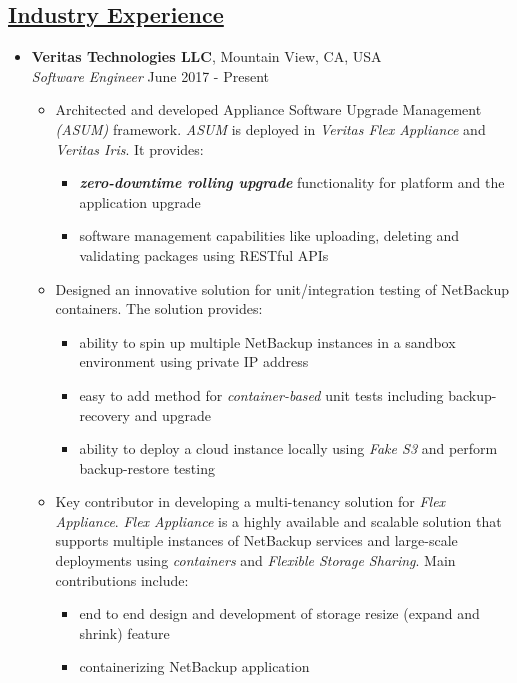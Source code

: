 \documentclass[10pt]{article}
\begin{document}
\subsection*{\underline{Industry Experience}}
\vspace{-0.1cm}
\begin{itemize}[leftmargin=0.15in]
\item {\bfseries Veritas Technologies LLC}, Mountain View, CA, USA \\
{\sl Software Engineer}  \hfill June 2017 - Present
\vspace{-0.15cm}
\begin{itemize}
\setlength{\itemsep}{0.4em}%
\item Architected and developed Appliance Software Upgrade Management \textit{(ASUM)} framework. \textit{ASUM} is deployed in \textit{Veritas Flex Appliance} and \textit{Veritas Iris}. It provides:
\begin{itemize}
\item \textbf{\textit {zero-downtime rolling upgrade}} functionality for platform and the application upgrade
\item software management capabilities like uploading, deleting and validating packages using RESTful APIs
\end{itemize}

\item Designed an innovative solution for unit/integration testing of NetBackup containers. The solution provides:
\begin{itemize}
\item ability to spin up multiple NetBackup instances in a sandbox environment using private IP address
\item easy to add method for \textit{container-based} unit tests including backup-recovery and upgrade
\item ability to deploy a cloud instance locally using \textit{Fake S3} and perform backup-restore testing
\end{itemize}
\item Key contributor in developing a multi-tenancy solution for \textit{Flex Appliance}. \textit{Flex Appliance} is a highly available and scalable solution that supports multiple instances of NetBackup services and large-scale deployments using \textit{containers} and \textit{Flexible Storage Sharing}. Main contributions include:
\begin{itemize}
\item end to end design and development of storage resize (expand and shrink) feature
\item containerizing NetBackup application
\end{itemize}


\end{itemize}
\end{itemize}
\end{document}
